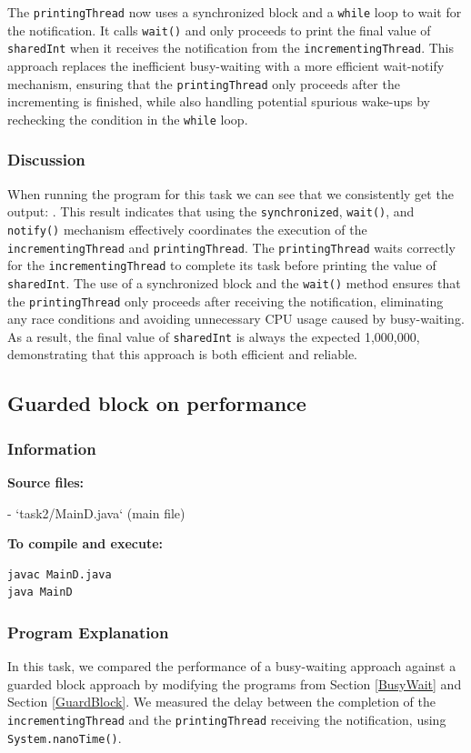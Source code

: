\documentclass{article}
\begin{document}
The \texttt{printingThread} now uses a synchronized block and a \texttt{while} loop to wait for the notification. It calls \texttt{wait()} and only proceeds to print the final value of \texttt{sharedInt} when it receives the notification from the \texttt{incrementingThread}. This approach replaces the inefficient busy-waiting with a more efficient wait-notify mechanism, ensuring that the \texttt{printingThread} only proceeds after the incrementing is finished, while also handling potential spurious wake-ups by rechecking the condition in the \texttt{while} loop.

\subsubsection{Discussion}
When running the program for this task we can see that we consistently get the output: . This result indicates that using the \texttt{synchronized}, \texttt{wait()}, and \texttt{notify()} mechanism effectively coordinates the execution of the \texttt{incrementingThread} and \texttt{printingThread}. The \texttt{printingThread} waits correctly for the \texttt{incrementingThread} to complete its task before printing the value of \texttt{sharedInt}. The use of a synchronized block and the \texttt{wait()} method ensures that the \texttt{printingThread} only proceeds after receiving the notification, eliminating any race conditions and avoiding unnecessary CPU usage caused by busy-waiting. As a result, the final value of \texttt{sharedInt} is always the expected 1,000,000, demonstrating that this approach is both efficient and reliable.



\subsection{Guarded block on performance}

\subsubsection{Information}
\textbf{Source files:}

- `task2/MainD.java` (main file)

\textbf{To compile and execute:}
\begin{lstlisting}[style=bash]
javac MainD.java
java MainD
\end{lstlisting}

\subsubsection{Program Explanation}
In this task, we compared the performance of a busy-waiting approach against a guarded block approach by modifying the programs from Section \ref{BusyWait} and Section \ref{GuardBlock}. We measured the delay between the completion of the \texttt{incrementingThread} and the \texttt{printingThread} receiving the notification, using \texttt{System.nanoTime()}.
\end{document}
